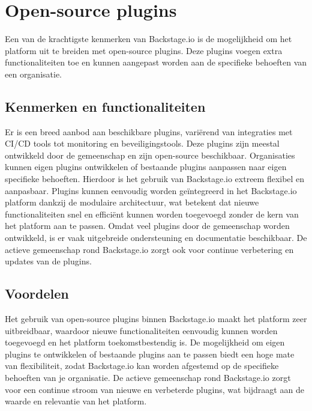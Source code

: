 \section{Open-source plugins}

Een van de krachtigste kenmerken van Backstage.io is de mogelijkheid om het platform uit te breiden met open-source plugins. Deze plugins voegen extra functionaliteiten toe en kunnen aangepast worden aan de specifieke behoeften van een organisatie.

\subsection{Kenmerken en functionaliteiten}

Er is een breed aanbod aan beschikbare plugins, variërend van integraties met CI/CD tools tot monitoring en beveiligingstools. Deze plugins zijn meestal ontwikkeld door de gemeenschap en zijn open-source beschikbaar. Organisaties kunnen eigen plugins ontwikkelen of bestaande plugins aanpassen naar eigen specifieke behoeften. Hierdoor is het gebruik van Backstage.io extreem flexibel en aanpasbaar. Plugins kunnen eenvoudig worden geïntegreerd in het Backstage.io platform dankzij de modulaire architectuur, wat betekent dat nieuwe functionaliteiten snel en efficiënt kunnen worden toegevoegd zonder de kern van het platform aan te passen. Omdat veel plugins door de gemeenschap worden ontwikkeld, is er vaak uitgebreide ondersteuning en documentatie beschikbaar. De actieve gemeenschap rond Backstage.io zorgt ook voor continue verbetering en updates van de plugins.

\subsection{Voordelen}

Het gebruik van open-source plugins binnen Backstage.io maakt het platform zeer uitbreidbaar, waardoor nieuwe functionaliteiten eenvoudig kunnen worden toegevoegd en het platform toekomstbestendig is. De mogelijkheid om eigen plugins te ontwikkelen of bestaande plugins aan te passen biedt een hoge mate van flexibiliteit, zodat Backstage.io kan worden afgestemd op de specifieke behoeften van je organisatie. De actieve gemeenschap rond Backstage.io zorgt voor een continue stroom van nieuwe en verbeterde plugins, wat bijdraagt aan de waarde en relevantie van het platform.
